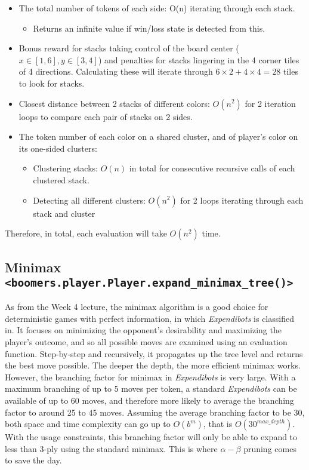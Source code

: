 \documentclass[]{article}
\newcommand{\gameName}{Expendibots}
\begin{document}
\begin{itemize}
    \item The total number of tokens of each side: O(n) iterating through each stack.
    \begin{itemize}
        \item Returns an infinite value if win/loss state is detected from this.
    \end{itemize}
    \item Bonus reward for stacks taking control of the board center ($x\in[1,6], y\in[3,4]$) and penalties for stacks lingering in the 4 corner tiles of 4 directions. Calculating these will iterate through $6\times2+4\times4=28$ tiles to look for stacks.
    \item Closest distance between 2 stacks of different colors: $O(n^2)$ for 2 iteration loops to compare each pair of stacks on 2 sides.
    \item The token number of each color on a shared cluster, and of player's color on its one-sided clusters:
    \begin{itemize}
        \item Clustering stacks: $O(n)$ in total for consecutive recursive calls of each clustered stack.
        \item Detecting all different clusters: $O(n^2)$ for 2 loops iterating through each stack and cluster
    \end{itemize}
\end{itemize}

Therefore, in total, each evaluation will take $O(n^2)$ time.

\subsection{Minimax \texttt{<boomers.player.Player.expand\_minimax\_tree()>}}

As from the Week 4 lecture, the minimax algorithm is a good choice for deterministic games with perfect information, in which \emph{\gameName} is classified in. It focuses on minimizing the opponent's desirability and maximizing the player's outcome, and so all possible moves are examined using an evaluation function. Step-by-step and recursively, it propagates up the tree level and returns the best move possible. The deeper the depth, the more efficient minimax works.\\

However, the branching factor for minimax in \emph{\gameName} is very large. With a maximum branching of up to 5 moves per token, a standard \emph{\gameName} can be available of up to 60 moves, and therefore more likely to average the branching factor to around 25 to 45 moves. Assuming the average branching factor to be 30, both space and time complexity can go up to $O(b^m)$, that is $O(30^{max\_depth})$. With the usage constraints, this branching factor will only be able to expand to less than 3-ply using the standard minimax. This is where $\alpha-\beta$ pruning comes to save the day.
\end{document}
